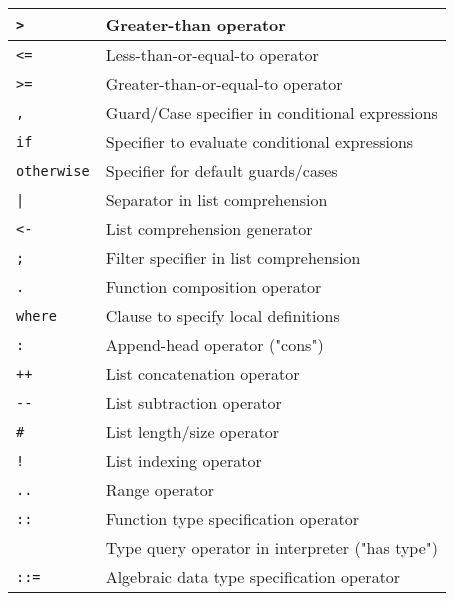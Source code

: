 \documentclass[]{article}
\begin{document}
\begin{minipage}[t][0pt]{\linewidth}
\begin{tabular}{ | l | l | }
	\texttt{>}                      & Greater-than operator                             \\ \hline
	\texttt{<=}                     & Less-than-or-equal-to operator                    \\ \hline
	\texttt{>=}                     & Greater-than-or-equal-to operator                 \\ \hline
	\hline
	\texttt{,}                      & Guard/Case specifier in conditional expressions   \\ \hline
	\texttt{if}                     & Specifier to evaluate conditional expressions     \\ \hline
	\texttt{otherwise}              & Specifier for default guards/cases                \\ \hline
	\texttt{|}                      & Separator in list comprehension                   \\ \hline
	\texttt{<-}                     & List comprehension generator                      \\ \hline
	\texttt{;}                      & Filter specifier in list comprehension            \\ \hline
	\hline
	\texttt{.}                      & Function composition operator                     \\ \hline
	\texttt{where}                  & Clause to specify local definitions               \\ \hline
	\texttt{:}                      & Append-head operator ("cons")                     \\ \hline
	\texttt{++}                     & List concatenation operator                       \\ \hline
	\texttt{-{}-}                   & List subtraction operator                         \\ \hline
	\texttt{\#}                     & List length/size operator                         \\ \hline
	\texttt{!}                      & List indexing operator                            \\ \hline
	\texttt{..}                     & Range operator                                    \\ \hline
	\hline
	\texttt{::}                     & Function type specification operator              \\ 
	                                & Type query operator in interpreter ("has type")   \\ \hline
	\texttt{::=}                    & Algebraic data type specification operator        \\ \hline

\end{tabular}
\end{minipage}
\end{document}
